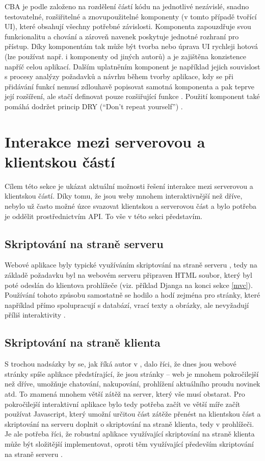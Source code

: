     CBA je podle \cite{cba3} založeno na rozdělení částí kódu na jednotlivé nezávislé, snadno testovatelné, rozšiřitelné a znovupoužitelné komponenty (v tomto případě tvořící UI), které obsahují všechny potřebné závislosti. Komponenta zapouzdřuje svou funkcionalitu a chování a zároveň navenek poskytuje jednotné rozhraní pro přístup. Díky komponentám tak může být tvorba nebo úprava UI rychleji hotová (lze používat např. i komponenty od jiných autorů) a je zajištěna konzistence napříč celou aplikací. Dalším uplatněním komponent je například jejich souvislost s procesy analýzy požadavků a návrhu během tvorby aplikace, kdy se při přidávání funkcí nemusí zdlouhavě popisovat samotná komponenta a pak teprve její rozšíření, ale stačí definovat pouze rozšiřující funkce \cite{cba1}. Použití komponent také pomáhá dodržet princip DRY (\enquote{Don't repeat yourself}) \cite{cba2}.
    
    \section{Interakce mezi serverovou a klientskou částí}\label{interakce}
    Cílem této sekce je ukázat aktuální možnosti řešení interakce mezi serverovou a klientskou částí. Díky tomu, že jsou weby mnohem interaktivnější než dříve, nebylo už často možné úzce svazovat klientskou a serverovou část a bylo potřeba je oddělit prostřednictvím API. To vše v této sekci představím.
    
        \subsection{Skriptování na straně serveru}
        Webové aplikace byly typické využíváním skriptování na straně serveru \cite{moderni-webapps}, tedy na základě požadavku byl na webovém serveru připraven HTML soubor, který byl poté odeslán do klientova prohlížeče \cite{scripting-sqa} (viz. příklad Djanga na konci sekce \ref{mvc}). Používání tohoto způsobu samostatně se hodilo a hodí zejména pro stránky, které například přímo spolupracují s databází, vrací texty a obrázky, ale nevyžadují příliš interaktivity \cite{scripting-freecodecamp}.
        
        \subsection{Skriptování na straně klienta}\label{client-side-scripting}
        S trochou nadsázky by se, jak říká autor v \cite{scripting-freecodecamp}, dalo říci, že dnes jsou webové stránky spíše aplikace předstírající, že jsou stránky -- web je mnohem pokročilejší než dříve, umožňuje chatování, nakupování, prohlížení aktuálního proudu novinek atd. To znamená mnohem větší zátěž na server, který vše musí obstarat. Pro pokročilejší interaktivní aplikace bylo tedy potřeba začít ve větší míře začít používat Javascript, který umožní určitou část zátěže přenést na klientskou část \cite{scripting-upwork} a skriptování na serveru doplnit o skriptování na straně klienta, tedy v prohlížeči. Je ale potřeba říci, že robustní aplikace využívající skriptování na straně klienta může být složitější implementovat, oproti těm využívající především skriptování na straně serveru \cite{scripting-fasthosts}.
        

